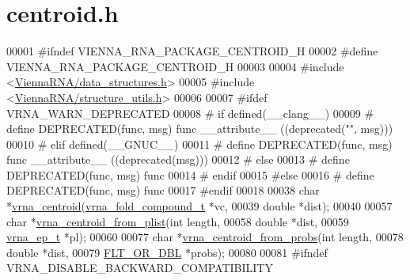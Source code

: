 \hypertarget{centroid_8h_source}{}\section{centroid.\+h}
\label{centroid_8h_source}

\begin{DoxyCode}
00001 \textcolor{preprocessor}{#ifndef VIENNA\_RNA\_PACKAGE\_CENTROID\_H}
00002 \textcolor{preprocessor}{#define VIENNA\_RNA\_PACKAGE\_CENTROID\_H}
00003 
00004 \textcolor{preprocessor}{#include <\hyperlink{data__structures_8h}{ViennaRNA/data\_structures.h}>}
00005 \textcolor{preprocessor}{#include <\hyperlink{structure__utils_8h}{ViennaRNA/structure\_utils.h}>}
00006 
00007 \textcolor{preprocessor}{#ifdef VRNA\_WARN\_DEPRECATED}
00008 \textcolor{preprocessor}{# if defined(\_\_clang\_\_)}
00009 \textcolor{preprocessor}{#  define DEPRECATED(func, msg) func \_\_attribute\_\_ ((deprecated("", msg)))}
00010 \textcolor{preprocessor}{# elif defined(\_\_GNUC\_\_)}
00011 \textcolor{preprocessor}{#  define DEPRECATED(func, msg) func \_\_attribute\_\_ ((deprecated(msg)))}
00012 \textcolor{preprocessor}{# else}
00013 \textcolor{preprocessor}{#  define DEPRECATED(func, msg) func}
00014 \textcolor{preprocessor}{# endif}
00015 \textcolor{preprocessor}{#else}
00016 \textcolor{preprocessor}{# define DEPRECATED(func, msg) func}
00017 \textcolor{preprocessor}{#endif}
00018 
00038 \textcolor{keywordtype}{char} *\hyperlink{group__centroid__fold_ga0e64bb67e51963dc71cbd4d30b80a018}{vrna\_centroid}(\hyperlink{group__fold__compound_structvrna__fc__s}{vrna\_fold\_compound\_t} *vc,
00039                     \textcolor{keywordtype}{double} *dist);
00040 
00057 \textcolor{keywordtype}{char}  *\hyperlink{group__centroid__fold_ga13881673a0b214d42a59140ef5764dbb}{vrna\_centroid\_from\_plist}(\textcolor{keywordtype}{int} length,
00058                                 \textcolor{keywordtype}{double} *dist,
00059                                 \hyperlink{group__struct__utils_structvrna__elem__prob__s}{vrna\_ep\_t} *pl);
00060 
00077 \textcolor{keywordtype}{char}  *\hyperlink{group__centroid__fold_ga98193ede06778a9ea966cc8fc43d0804}{vrna\_centroid\_from\_probs}(\textcolor{keywordtype}{int} length,
00078                                 \textcolor{keywordtype}{double} *dist,
00079                                 \hyperlink{group__data__structures_ga31125aeace516926bf7f251f759b6126}{FLT\_OR\_DBL} *probs);
00080 
00081 \textcolor{preprocessor}{#ifndef VRNA\_DISABLE\_BACKWARD\_COMPATIBILITY}

\end{DoxyCode}
